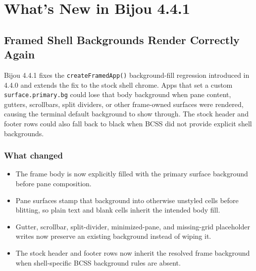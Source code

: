 \chapter{What's New in Bijou 4.4.1}\label{record-279}

\smallskip

\section{Framed Shell Backgrounds Render Correctly Again}\label{record-279-framed-shell-backgrounds-render-correctly-again}

Bijou 4.4.1 fixes the \texttt{c\allowbreak{}r\allowbreak{}e\allowbreak{}a\allowbreak{}t\allowbreak{}e\allowbreak{}F\allowbreak{}r\allowbreak{}a\allowbreak{}m\allowbreak{}e\allowbreak{}d\allowbreak{}A\allowbreak{}p\allowbreak{}p\allowbreak{}(\allowbreak{})} background-fill regression introduced in 4.4.0 and extends the fix to the stock shell chrome. Apps that set a custom \texttt{s\allowbreak{}u\allowbreak{}r\allowbreak{}f\allowbreak{}a\allowbreak{}c\allowbreak{}e\allowbreak{}.\allowbreak{}p\allowbreak{}r\allowbreak{}i\allowbreak{}m\allowbreak{}a\allowbreak{}r\allowbreak{}y\allowbreak{}.\allowbreak{}b\allowbreak{}g} could lose that body background when pane content, gutters, scrollbars, split dividers, or other frame-owned surfaces were rendered, causing the terminal default background to show through. The stock header and footer rows could also fall back to black when BCSS did not provide explicit shell backgrounds.

\subsection{What changed}\label{record-279-what-changed}

\begin{itemize}
\tightlist
\item
  The frame body is now explicitly filled with the primary surface background before pane composition.
\item
  Pane surfaces stamp that background into otherwise unstyled cells before blitting, so plain text and blank cells inherit the intended body fill.
\item
  Gutter, scrollbar, split-divider, minimized-pane, and missing-grid placeholder writes now preserve an existing background instead of wiping it.
\item
  The stock header and footer rows now inherit the resolved frame background when shell-specific BCSS background rules are absent.
\end{itemize}

